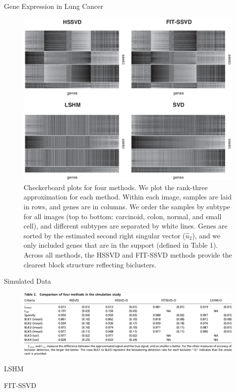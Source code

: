 \documentclass{beamer}
\begin{document}
\begin{frame}{Gene Expression in Lung Cancer}
  \begin{figure}
    \includegraphics[height=.6\textheight,keepaspectratio]{figures/fig4.png}
    \caption{Checkerboard plots for four methods. We plot the rank-three
      approximation for each method. Within each image, samples are laid in
      rows, and genes are in columns. We order the samples by subtype for all
      images (top to bottom: carcinoid, colon, normal, and small cell), and
      different subtypes are separated by white lines. Genes are sorted by the
      estimated second right singular vector ($\hat{u}_2$), and we only
      included genes that are in the support (defined in Table 1). Across all
      methods, the HSSVD and FIT-SSVD methods provide the clearest block
      structure reflecting biclusters.}
  \end{figure}
\end{frame}

\begin{frame}{Simulated Data}
  \begin{figure}
  \includegraphics[width=\linewidth,keepaspectratio]{figures/table2.png}
  \end{figure}
\end{frame}

\begin{frame}[label=end, standout]
\end{frame}

\appendix

\begin{frame}{LSHM}
\end{frame}

\begin{frame}{FIT-SSVD}
\end{frame}
\end{document}
